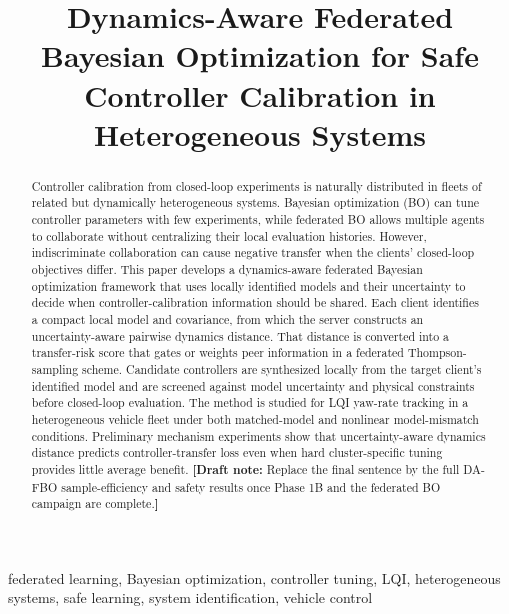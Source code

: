 \documentclass[conference]{IEEEtran}
\title{Dynamics-Aware Federated Bayesian Optimization for Safe Controller Calibration in Heterogeneous Systems}
\author{\IEEEauthorblockN{Jakob Weber, Markus Gurtner, Adrian Trachte, Andreas Kugi}
\IEEEauthorblockA{\textit{Draft author list -- affiliations to be inserted after venue decision}}}
\newcommand{\draftnote}[1]{\textcolor{blue!70!black}{\textbf{[Draft note:} #1\textbf{]}}}
\begin{document}
\maketitle

\begin{abstract}
Controller calibration from closed-loop experiments is naturally distributed in fleets of related but dynamically heterogeneous systems. Bayesian optimization (BO) can tune controller parameters with few experiments, while federated BO allows multiple agents to collaborate without centralizing their local evaluation histories. However, indiscriminate collaboration can cause negative transfer when the clients' closed-loop objectives differ. This paper develops a dynamics-aware federated Bayesian optimization framework that uses locally identified models and their uncertainty to decide when controller-calibration information should be shared. Each client identifies a compact local model and covariance, from which the server constructs an uncertainty-aware pairwise dynamics distance. That distance is converted into a transfer-risk score that gates or weights peer information in a federated Thompson-sampling scheme. Candidate controllers are synthesized locally from the target client's identified model and are screened against model uncertainty and physical constraints before closed-loop evaluation. The method is studied for LQI yaw-rate tracking in a heterogeneous vehicle fleet under both matched-model and nonlinear model-mismatch conditions. Preliminary mechanism experiments show that uncertainty-aware dynamics distance predicts controller-transfer loss even when hard cluster-specific tuning provides little average benefit. \draftnote{Replace the final sentence by the full DA-FBO sample-efficiency and safety results once Phase 1B and the federated BO campaign are complete.}
\end{abstract}

\begin{IEEEkeywords}
federated learning, Bayesian optimization, controller tuning, LQI, heterogeneous systems, safe learning, system identification, vehicle control
\end{IEEEkeywords}
\end{document}
